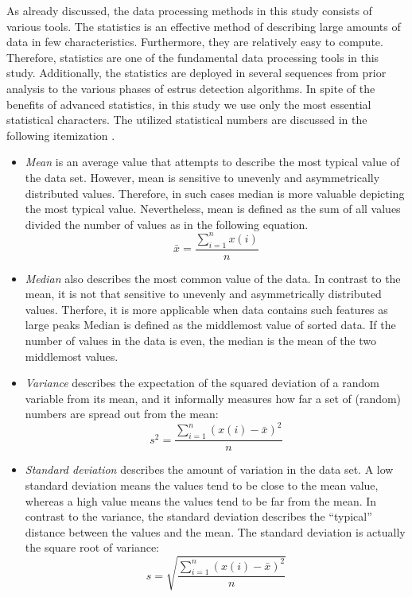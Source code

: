 \documentclass[english,12pt,a4paper,pdftex,elec,utf8]{aaltothesis}
\begin{document}
As already discussed, the data processing methods in this study consists of various tools. The statistics is an effective method of describing large amounts of data in few characteristics. Furthermore, they are relatively easy to compute. Therefore, statistics are one of the fundamental data processing tools in this study. Additionally, the statistics are deployed in several sequences from prior analysis to the various phases of estrus detection algorithms. In spite of the benefits of advanced statistics, in this study we use only the most essential statistical characters. The utilized statistical numbers are discussed in the following itemization \cite{maoltaulukotmatematiikka}.

\begin{itemize}
\item \textit{Mean} is an average value that attempts to describe the most typical value of the data set. However, mean is sensitive to unevenly and asymmetrically distributed values. Therefore, in such cases median is more valuable depicting the most typical value. Nevertheless,  mean is defined as the sum of all values divided the number of values as in the following equation.
\begin{equation} \label{meanequation}
\bar{x} = \frac{\displaystyle \sum\limits^{n}_{i = 1} x(i)}{n}
\end{equation} 

\item \textit{Median} also describes the most common value of the data. In contrast to the mean, it is not that sensitive to unevenly and asymmetrically distributed values. Therfore, it is more applicable when data contains such features as large peaks Median is defined as the middlemost value of sorted data. If the number of values in the data is even, the median is the mean of the two middlemost values.

\item \textit{Variance} describes the expectation of the squared deviation of a random variable from its mean, and it informally measures how far a set of (random) numbers are spread out from the mean:
\begin{equation} \label{varianceequation}
s^2 = \frac{ \sum\limits_{i = 1}^{n}(x(i) - \bar{x})^2}{n}
\end{equation} 

\item \textit{Standard deviation} describes the amount of variation in the data set. A low standard deviation means the values tend to be close to the mean value, whereas a high value means the values tend to be far from the mean. In contrast to the variance, the standard deviation describes the ``typical''  distance between the values and the mean. The standard deviation is actually the square root of variance:
\begin{equation} \label{standarddeviationequation}
s = \sqrt{\frac{ \sum\limits_{i = 1}^{n}(x(i) - \bar{x})^2}{n}}
\end{equation}


\end{itemize}
\end{document}
